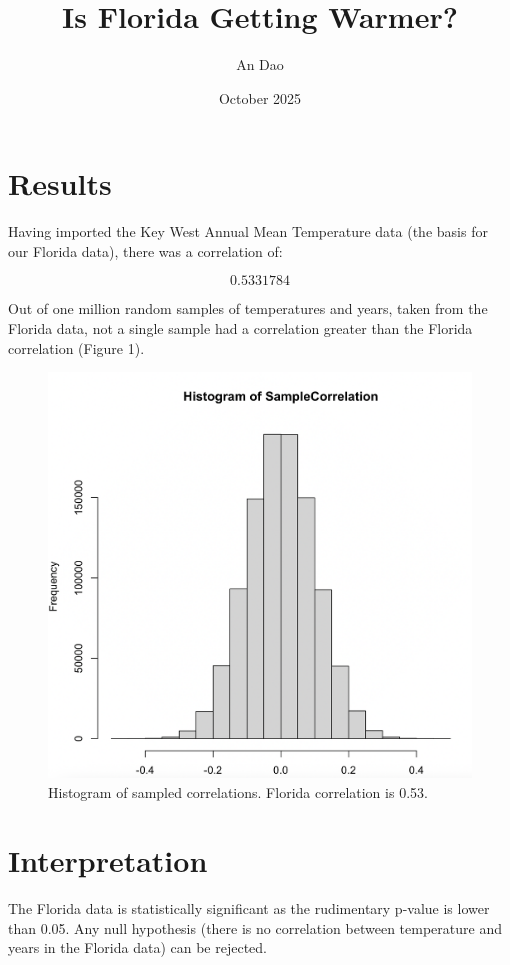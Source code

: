 \documentclass{article}
\title{Is Florida Getting Warmer?}
\author{An Dao}
\date{October 2025}
\begin{document}
\maketitle

\section{Results}
Having imported the Key West Annual Mean Temperature data (the basis for our Florida data), there was a correlation of:

\[ 0.5331784 \]

Out of one million random samples of temperatures and years, taken from the Florida data, not a single sample had a correlation greater than the Florida correlation (Figure 1).

\begin{figure}[h]
\begin{center}
    \includegraphics[width=.5\textwidth]{images/Histogram.png}\hfill
\end{center}
    \caption{Histogram of sampled correlations. Florida correlation is 0.53.}
\end{figure}

\section{Interpretation}
The Florida data is statistically significant as the rudimentary p-value is lower than 0.05. Any null hypothesis (there is no correlation between temperature and years in the Florida data) can be rejected.
\end{document}
